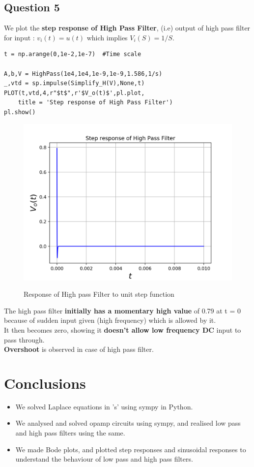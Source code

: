\documentclass[11pt, a4paper]{article}
\begin{document}
\subsection{Question 5}
{
We plot the \textbf{step response of High Pass Filter}, (i.e) output of high pass filter for input :
\(v_i(t) = u(t)\)
which implies $V_i(S) = 1/S$.
}
\begin{verbatim}
t = np.arange(0,1e-2,1e-7)  #Time scale

A,b,V = HighPass(1e4,1e4,1e-9,1e-9,1.586,1/s)
_,vtd = sp.impulse(Simplify_H(V),None,t)
PLOT(t,vtd,4,r"$t$",r'$V_o(t)$',pl.plot,
	title = 'Step response of High Pass Filter')
pl.show()

\end{verbatim}
\begin{figure}[H]
   	\centering
   	\includegraphics[scale=0.5]{step_hpf.png}
   	\label{fig:step_hpf}
   	\caption{Response of High pass Filter to unit step function}
\end{figure}
{ 
The high pass filter\textbf{ initially has a momentary high value} of 0.79 at t = 0 because of sudden input given (high frequency) which is allowed by it.
\\It then becomes zero, showing it \textbf{doesn't allow low frequency DC} input to pass through.
\\\textbf{Overshoot} is observed in case of high pass filter.
}

\section{Conclusions}
\begin{itemize}
\item We  solved Laplace equations in 's' using sympy in Python.
\item We analysed and solved opamp circuits using sympy, and realised low pass and high pass filters using the same.
\item We made Bode plots, and plotted step responses and sinusoidal responses to understand the behaviour of low pass and high pass filters.
\end{itemize}
\end{document}
